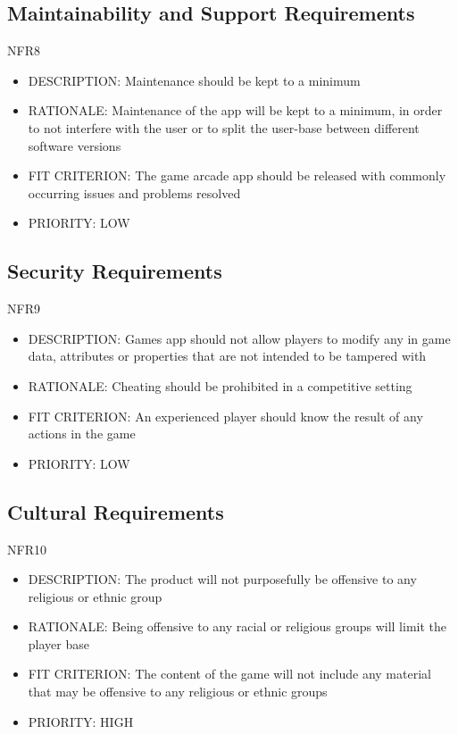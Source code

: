 \documentclass[12pt, titlepage]{article}
\begin{document}
\subsection{Maintainability and Support Requirements}
NFR8
\begin{itemize}
    \item DESCRIPTION:  Maintenance should be kept to a minimum
    \item RATIONALE: Maintenance of the app will be kept to a minimum, in order to not
interfere with the user or to split the user-base between different software versions
    \item FIT CRITERION: The game arcade app should be released with commonly occurring issues and problems resolved
    \item PRIORITY: LOW
\end{itemize}

\subsection{Security Requirements}
NFR9
\begin{itemize}
    \item DESCRIPTION: Games app should not allow players to modify any in game data, attributes or properties 
that are not intended to be tampered with
    \item RATIONALE:  Cheating should be prohibited in a competitive setting
    \item FIT CRITERION: An experienced player should know the result of any actions in the game
    \item PRIORITY: LOW
\end{itemize}

\subsection{Cultural Requirements}
NFR10
\begin{itemize}
    \item DESCRIPTION: The product will not purposefully be offensive to any religious or ethnic group
    \item RATIONALE: Being offensive to any racial or religious groups will limit the player base
    \item FIT CRITERION: The content of the game will not include any material that may be offensive to any religious or ethnic groups
    \item PRIORITY: HIGH
\end{itemize}
\end{document}
